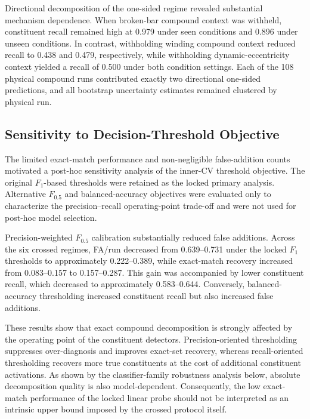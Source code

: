 Directional decomposition of the one-sided regime revealed substantial
mechanism dependence. When broken-bar compound context was withheld,
constituent recall remained high at 0.979 under seen conditions and 0.896
under unseen conditions. In contrast, withholding winding compound context
reduced recall to 0.438 and 0.479, respectively, while withholding
dynamic-eccentricity context yielded a recall of 0.500 under both condition
settings. Each of the 108 physical compound runs contributed exactly two
directional one-sided predictions, and all bootstrap uncertainty estimates
remained clustered by physical run.

\subsection{Sensitivity to Decision-Threshold Objective}
\label{sec:thresholdsensitivity}

The limited exact-match performance and non-negligible false-addition
counts motivated a post-hoc sensitivity analysis of the inner-CV threshold
objective. The original $F_1$-based thresholds were retained as the locked
primary analysis. Alternative $F_{0.5}$ and balanced-accuracy objectives
were evaluated only to characterize the precision--recall operating-point
trade-off and were not used for post-hoc model selection.

Precision-weighted $F_{0.5}$ calibration substantially reduced false
additions. Across the six crossed regimes, FA/run decreased from
0.639--0.731 under the locked $F_1$ thresholds to approximately
0.222--0.389, while exact-match recovery increased from 0.083--0.157 to
0.157--0.287. This gain was accompanied by lower constituent recall, which
decreased to approximately 0.583--0.644. Conversely, balanced-accuracy
thresholding increased constituent recall but also increased false
additions.

These results show that exact compound decomposition is strongly affected
by the operating point of the constituent detectors. Precision-oriented
thresholding suppresses over-diagnosis and improves exact-set recovery,
whereas recall-oriented thresholding recovers more true constituents at the
cost of additional constituent activations. As shown by the
classifier-family robustness analysis below, absolute decomposition quality
is also model-dependent. Consequently, the low exact-match performance of
the locked linear probe should not be interpreted as an intrinsic upper
bound imposed by the crossed protocol itself.

